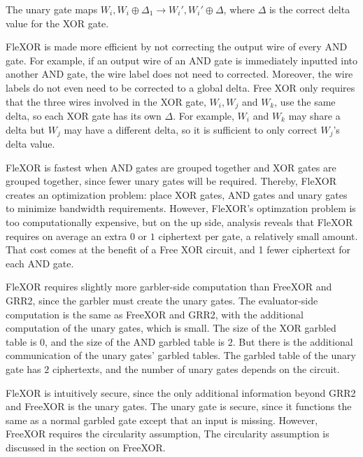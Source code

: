 The unary gate maps $W_i,W_i \oplus \Delta_1 \to W_i', W_i' \oplus \Delta$, where $\Delta$ is the correct delta value for the XOR gate.

FleXOR is made more efficient by not correcting the output wire of every AND gate.
For example, if an output wire of an AND gate is immediately inputted into another AND gate, the wire label does not need to corrected.
Moreover, the wire labels do not even need to be corrected to a global delta.
Free XOR only requires that the three wires involved in the XOR gate, $W_i, W_j$ and $W_k$, use the same delta, so each XOR gate has its own $\Delta$.
For example, $W_i$ and $W_k$ may share a delta but $W_j$ may have a different delta, so it is sufficient to only correct $W_j$'s delta value.

FleXOR is fastest when AND gates are grouped together and XOR gates are grouped together, since fewer unary gates will be required.
Thereby, FleXOR creates an optimization problem: place XOR gates, AND gates and unary gates to minimize bandwidth requirements.
However, FleXOR's optimzation problem is too computationally expensive, but on the up side, analysis reveals that FleXOR requires on average an extra $0$ or $1$ ciphertext per gate, a relatively small amount.
That cost comes at the benefit of a Free XOR circuit, and 1 fewer ciphertext for each AND gate.

FleXOR requires slightly more garbler-side computation than FreeXOR and GRR2, since the garbler must create the unary gates.
The evaluator-side computation is the same as FreeXOR and GRR2, with the additional computation of the unary gates, which is small.
The size of the XOR garbled table is $0$, and the size of the AND garbled table is $2$.
But there is the additional communication of the unary gates' garbled tables.
The garbled table of the unary gate has $2$ ciphertexts, and the number of unary gates depends on the circuit.

FleXOR is intuitively secure, since the only additional information beyond GRR2 and FreeXOR is the unary gates.
The unary gate is secure, since it functions the same as a normal garbled gate except that an input is missing.
However, FreeXOR requires the circularity assumption, 
The circularity assumption is discussed in the section on FreeXOR.

